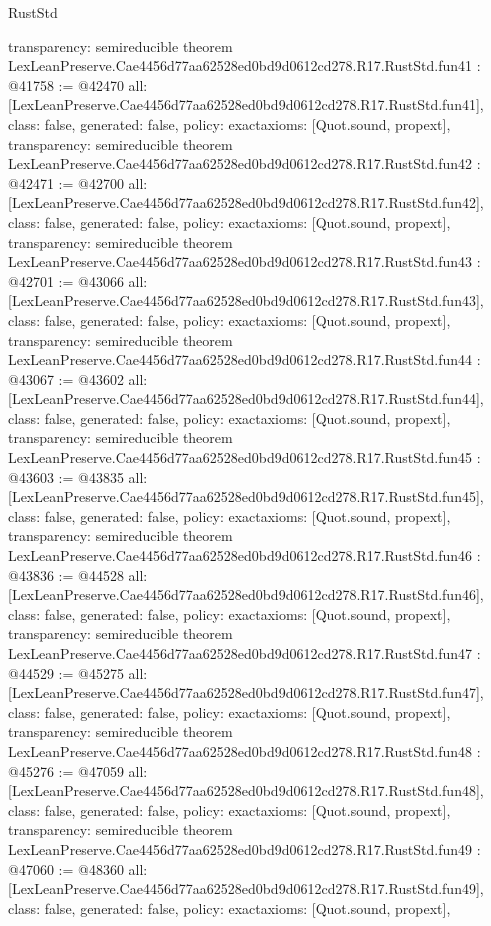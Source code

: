 \begin{lexlean}{RustStd}
\begin{coremodule}
{  transparency: semireducible
}
theorem LexLeanPreserve.Cae4456d77aa62528ed0bd9d0612cd278.R17.RustStd.fun41 : @41758 := @42470 {
  all: [LexLeanPreserve.Cae4456d77aa62528ed0bd9d0612cd278.R17.RustStd.fun41],
  class: false,
  generated: false,
  policy: exact{axioms: [Quot.sound, propext]},
  transparency: semireducible
}
theorem LexLeanPreserve.Cae4456d77aa62528ed0bd9d0612cd278.R17.RustStd.fun42 : @42471 := @42700 {
  all: [LexLeanPreserve.Cae4456d77aa62528ed0bd9d0612cd278.R17.RustStd.fun42],
  class: false,
  generated: false,
  policy: exact{axioms: [Quot.sound, propext]},
  transparency: semireducible
}
theorem LexLeanPreserve.Cae4456d77aa62528ed0bd9d0612cd278.R17.RustStd.fun43 : @42701 := @43066 {
  all: [LexLeanPreserve.Cae4456d77aa62528ed0bd9d0612cd278.R17.RustStd.fun43],
  class: false,
  generated: false,
  policy: exact{axioms: [Quot.sound, propext]},
  transparency: semireducible
}
theorem LexLeanPreserve.Cae4456d77aa62528ed0bd9d0612cd278.R17.RustStd.fun44 : @43067 := @43602 {
  all: [LexLeanPreserve.Cae4456d77aa62528ed0bd9d0612cd278.R17.RustStd.fun44],
  class: false,
  generated: false,
  policy: exact{axioms: [Quot.sound, propext]},
  transparency: semireducible
}
theorem LexLeanPreserve.Cae4456d77aa62528ed0bd9d0612cd278.R17.RustStd.fun45 : @43603 := @43835 {
  all: [LexLeanPreserve.Cae4456d77aa62528ed0bd9d0612cd278.R17.RustStd.fun45],
  class: false,
  generated: false,
  policy: exact{axioms: [Quot.sound, propext]},
  transparency: semireducible
}
theorem LexLeanPreserve.Cae4456d77aa62528ed0bd9d0612cd278.R17.RustStd.fun46 : @43836 := @44528 {
  all: [LexLeanPreserve.Cae4456d77aa62528ed0bd9d0612cd278.R17.RustStd.fun46],
  class: false,
  generated: false,
  policy: exact{axioms: [Quot.sound, propext]},
  transparency: semireducible
}
theorem LexLeanPreserve.Cae4456d77aa62528ed0bd9d0612cd278.R17.RustStd.fun47 : @44529 := @45275 {
  all: [LexLeanPreserve.Cae4456d77aa62528ed0bd9d0612cd278.R17.RustStd.fun47],
  class: false,
  generated: false,
  policy: exact{axioms: [Quot.sound, propext]},
  transparency: semireducible
}
theorem LexLeanPreserve.Cae4456d77aa62528ed0bd9d0612cd278.R17.RustStd.fun48 : @45276 := @47059 {
  all: [LexLeanPreserve.Cae4456d77aa62528ed0bd9d0612cd278.R17.RustStd.fun48],
  class: false,
  generated: false,
  policy: exact{axioms: [Quot.sound, propext]},
  transparency: semireducible
}
theorem LexLeanPreserve.Cae4456d77aa62528ed0bd9d0612cd278.R17.RustStd.fun49 : @47060 := @48360 {
  all: [LexLeanPreserve.Cae4456d77aa62528ed0bd9d0612cd278.R17.RustStd.fun49],
  class: false,
  generated: false,
  policy: exact{axioms: [Quot.sound, propext]},
}
\end{coremodule}
\end{lexlean}
